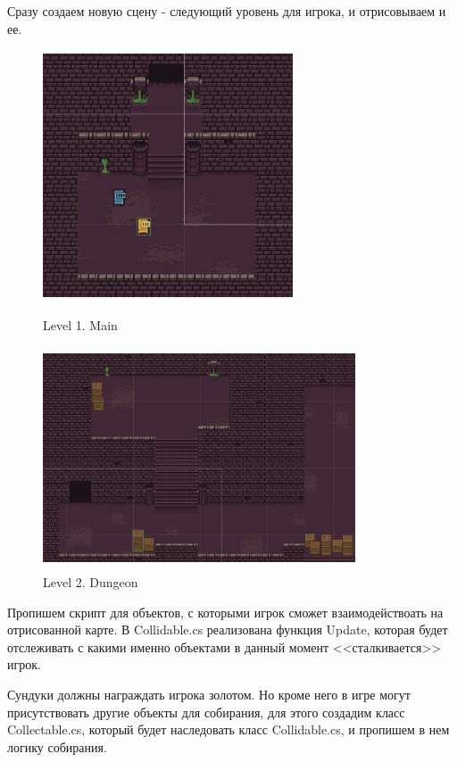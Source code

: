 \documentclass[a4paper,12pt]{article}
\begin{document}
Сразу создаем новую сцену - следующий уровень для игрока, и отрисовываем и ее.

\newpage
\begin{figure}[h!]
\centering
\includegraphics[width = 280px, height=280px]{pictures/level1.png}
\caption{Level 1. Main}
\vspace{5mm}
\includegraphics[width = 350px, height=250px]{pictures/level2.png}
\caption{Level 2. Dungeon}
\end{figure}

\newpage
Пропишем скрипт для объектов, с которыми игрок сможет взаимодействоать на отрисованной карте. В Collidable.cs реализована функция Update, которая будет отслеживать с какими именно объектами в данный момент <<сталкивается>> игрок.

Сундуки должны награждать игрока золотом. Но кроме него в игре могут присутствовать другие объекты для собирания, для этого создадим класс Collectable.cs, который будет наследовать класс Collidable.cs, и пропишем в нем логику собирания.
\end{document}
